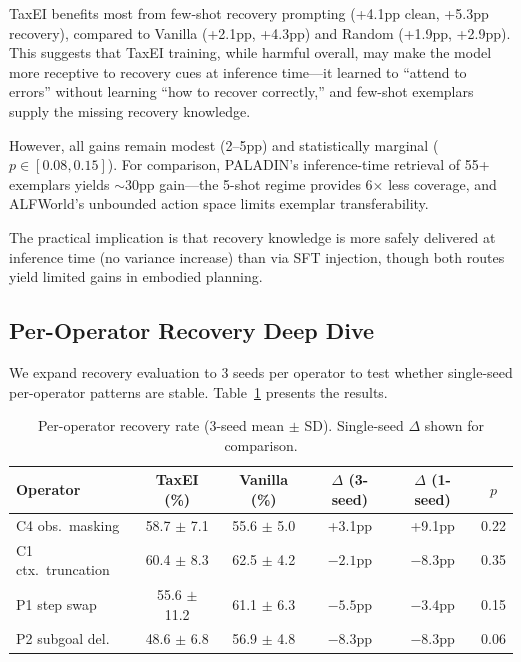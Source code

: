 \documentclass[11pt,a4paper]{article}
\begin{document}
TaxEI benefits most from few-shot recovery prompting (+4.1pp clean, +5.3pp recovery), compared to Vanilla (+2.1pp, +4.3pp) and Random (+1.9pp, +2.9pp). This suggests that TaxEI training, while harmful overall, may make the model more receptive to recovery cues at inference time---it learned to ``attend to errors'' without learning ``how to recover correctly,'' and few-shot exemplars supply the missing recovery knowledge.

However, all gains remain modest (2--5pp) and statistically marginal ($p \in [0.08, 0.15]$). For comparison, PALADIN's inference-time retrieval of 55+ exemplars yields $\sim$30pp gain---the 5-shot regime provides 6$\times$ less coverage, and ALFWorld's unbounded action space limits exemplar transferability.

The practical implication is that recovery knowledge is more safely delivered at inference time (no variance increase) than via SFT injection, though both routes yield limited gains in embodied planning.

\subsection{Per-Operator Recovery Deep Dive}
\label{sec:peroperator}

We expand recovery evaluation to 3 seeds per operator to test whether single-seed per-operator patterns are stable. Table~\ref{tab:peroperator} presents the results.

\begin{table}[t]
\centering
\small
\caption{Per-operator recovery rate (3-seed mean $\pm$ SD). Single-seed $\Delta$ shown for comparison.}
\label{tab:peroperator}
\begin{tabular}{lccccc}
\toprule
\textbf{Operator} & \textbf{TaxEI (\%)} & \textbf{Vanilla (\%)} & \textbf{$\Delta$ (3-seed)} & \textbf{$\Delta$ (1-seed)} & \textbf{$p$} \\
\midrule
C4 obs.\ masking & 58.7 $\pm$ 7.1 & 55.6 $\pm$ 5.0 & +3.1pp & +9.1pp & 0.22 \\
C1 ctx.\ truncation & 60.4 $\pm$ 8.3 & 62.5 $\pm$ 4.2 & $-2.1$pp & $-8.3$pp & 0.35 \\
P1 step swap & 55.6 $\pm$ 11.2 & 61.1 $\pm$ 6.3 & $-5.5$pp & $-3.4$pp & 0.15 \\
P2 subgoal del. & 48.6 $\pm$ 6.8 & 56.9 $\pm$ 4.8 & $-8.3$pp & $-8.3$pp & 0.06 \\
\bottomrule
\end{tabular}
\end{table}
\end{document}
